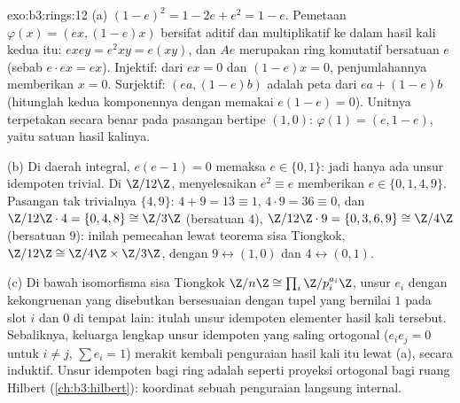 \begin{solution}{exo:b3:rings:12}
(a) $(1-e)^2 = 1 - 2e + e^2 = 1 - e$. Pemetaan $\varphi(x) =
(ex, (1-e)x)$ bersifat aditif dan multiplikatif ke dalam hasil kali
kedua  itu: $exey = e^2xy = e(xy)$, dan $Ae$ merupakan ring
komutatif bersatuan $e$ (sebab $e\cdot ex = ex$). Injektif:
dari $ex = 0$ dan $(1-e)x = 0$, penjumlahannya memberikan $x = 0$. Surjektif: $(ea,
(1-e)b)$ adalah peta dari $ea + (1-e)b$ (hitunglah kedua
komponennya dengan memakai $e(1-e) = 0$). Unitnya terpetakan secara benar pada
pasangan bertipe $(1, 0)$: $\varphi(1) = (e, 1-e)$, yaitu satuan
hasil kalinya.

(b) Di daerah integral, $e(e - 1) = 0$ memaksa $e \in \{0, 1\}$: jadi hanya
ada unsur idempoten trivial. Di $\Z/12\Z$, menyelesaikan $e^2 \equiv e$ memberikan $e
\in \{0, 1, 4, 9\}$. Pasangan tak trivialnya $\{4, 9\}$: $4 + 9 =
13 \equiv 1$, $4\cdot9 = 36 \equiv 0$, dan $\Z/12\Z\cdot4 =
\{0, 4, 8\} \cong \Z/3\Z$ (bersatuan $4$), $\Z/12\Z\cdot9 = \{0,
3, 6, 9\} \cong \Z/4\Z$ (bersatuan $9$): inilah pemecahan lewat teorema sisa Tiongkok,
$\Z/12\Z \cong \Z/4\Z\times\Z/3\Z$, dengan $9 \leftrightarrow
(1, 0)$ dan $4 \leftrightarrow (0, 1)$.

(c) Di bawah isomorfisma sisa Tiongkok $\Z/n\Z \cong \prod_i
\Z/p_i^{a_i}\Z$, unsur $e_i$ dengan kekongruenan yang
disebutkan bersesuaian dengan tupel yang bernilai $1$ pada slot $i$ dan
$0$ di tempat lain: itulah unsur idempoten elementer hasil kali tersebut.
Sebaliknya, keluarga lengkap unsur idempoten yang saling ortogonal
($e_ie_j = 0$ untuk $i \neq j$, $\sum e_i = 1$) merakit kembali
penguraian hasil kali itu lewat (a), secara induktif. Unsur idempoten bagi
ring adalah seperti proyeksi ortogonal bagi ruang Hilbert
(\cref{ch:b3:hilbert}): koordinat sebuah penguraian langsung
internal.
\end{solution}

